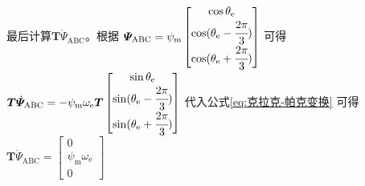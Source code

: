 最后计算\(\bm{T}\dot{\bm{\varPsi}}_{\mathrm{ABC}}\)。根据
\(\bm{\varPsi}_{\mathrm{ABC}}=
\psi_{\mathrm{m}}
\begin{bmatrix}\cos\theta_{\mathrm{e}}\\
    \cos(\theta_{\mathrm{e}}-\cfrac{2\pi}{3})\\
    \cos(\theta_{\mathrm{e}}+\cfrac{2\pi}{3})
\end{bmatrix}\)
可得
\(\bm{T}\dot{\bm{\varPsi}}_{\mathrm{ABC}}=
-\psi_{\mathrm{m}}\omega_{\mathrm{e}}\bm{T}
\begin{bmatrix}\sin\theta_{\mathrm{e}}\\
    \sin(\theta_{\mathrm{e}}-\cfrac{2\pi}{3})\\
    \sin(\theta_{\mathrm{e}}+\cfrac{2\pi}{3})
\end{bmatrix}\)
代入公式\eqref{eq:克拉克-帕克变换}
可得\(\bm{T}\dot{\bm{\varPsi}}_{\mathrm{ABC}}=\begin{bmatrix}0\\\psi_{\mathrm{m}}\omega_{\mathrm{e}}\\0\end{bmatrix}\)

